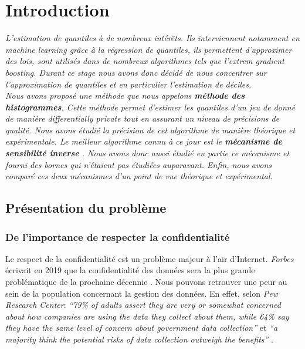 \section{Introduction}
\vspace*{10pt}
\begin{adjustwidth}{30pt}{30pt}
\textit{L'estimation de quantiles à de nombreux intérêts. Ils interviennent notamment en \textit{machine learning} grâce à la régression de quantiles, ils permettent d'approximer des lois, sont utilisés dans de nombreux algorithmes tels que l'\textit{extrem gradient boosting}. Durant ce stage nous avons donc décidé de nous concentrer sur l'approximation de quantiles et en particulier l'estimation de déciles.}\\

\textit{Nous avons proposé une méthode que nous appelons \textbf{méthode des histogrammes}. Cette méthode permet d'estimer les quantiles d'un jeu de donné de manière \textit{differentially private} tout en assurant un niveau de précisions de qualité. Nous avons étudié la précision de cet algorithme de manière théorique et expérimentale. Le meilleur algorithme connu à ce jour est le \textbf{mécanisme de sensibilité inverse} \cite{Asi2020NearII}. Nous avons donc aussi étudié en partie ce mécanisme et fourni des bornes qui n'étaient pas étudiées auparavant. Enfin, nous avons comparé ces deux mécanismes d'un point de vue théorique et expérimental.}
\end{adjustwidth}
\vspace*{10pt}

\subsection{Présentation du problème}

\subsubsection{De l'importance de respecter la confidentialité}

Le respect de la confidentialité est un problème majeur à l'air d'Internet. \textit{Forbes} écrivait en 2019 que la confidentialité des données sera la plus grande problématique de la prochaine décennie \cite{forbesdata}. Nous pouvons retrouver une peur au sein de la population concernant la gestion des données. En effet, selon \textit{Pew Research Center}: \textit{``79\% of adults assert they are very or somewhat concerned about how companies are using the data they collect about them, while 64\% say they have the same level of concern about government data collection''} et \textit{``a majority think the potential risks of data collection outweigh the benefits''} \cite{pew}.

